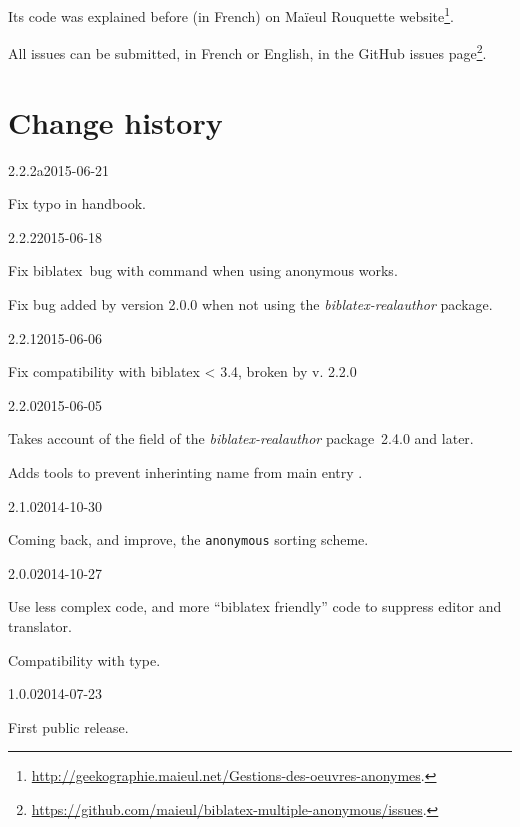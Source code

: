 \documentclass{ltxdockit}[2011/03/25]
\newcommand{\biblatex}{biblatex\xspace}
\begin{document}
Its code was explained before (in French) on Maïeul Rouquette website\footnote{\url{http://geekographie.maieul.net/Gestions-des-oeuvres-anonymes}.}.

All issues can be submitted, in French or English, in the GitHub issues page\footnote{\url{https://github.com/maieul/biblatex-multiple-anonymous/issues}.}.

\section{Change history}

\begin{changelog}

\begin{release}{2.2.2a}{2015-06-21}
  \item Fix typo in handbook.
 \end{release}

\begin{release}{2.2.2}{2015-06-18}
  \item Fix \biblatex\ bug with  \expandafter\cs\expandafter{\prm{xx}cites} command when using anonymous works.
  \item Fix bug added by version 2.0.0 when not using the \emph{biblatex-realauthor} package.
 \end{release}
\begin{release}{2.2.1}{2015-06-06}
 \item Fix compatibility with biblatex < 3.4, broken by v. 2.2.0
\end{release}
\begin{release}{2.2.0}{2015-06-05}
  \item Takes account of the  field of the \emph{biblatex-realauthor} package~2.4.0 and later.
  \item Adds tools to prevent inherinting name from main entry .
\end{release}

\begin{release}{2.1.0}{2014-10-30}
\item Coming back, and improve, the \verb+anonymous+ sorting scheme.
\end{release}

\begin{release}{2.0.0}{2014-10-27}
\item Use less complex code, and more \enquote{biblatex friendly} code to suppress editor and translator.
\item Compatibility with  type.
\end{release}

\begin{release}{1.0.0}{2014-07-23}
\item First public release.
\end{release}
\end{changelog}
\end{document}
